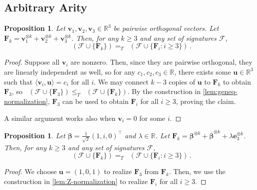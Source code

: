 \documentclass[11pt]{article}
\newtheorem{proposition}[theorem]{Proposition}
\DeclareMathOperator{\holts}{Holant^*_3}
\newcommand{\transpose}{^\intercal}
\begin{document}
\subsection{Arbitrary Arity}\label{subsec:arbitrary-arity}
\begin{proposition}\label{prop:geneq-get-all-arity}
  Let $\mathbf{v}_1, \mathbf{v}_2, \mathbf{v}_3 \in \mathbb{R}^3$ be pairwise orthogonal vectors.
  Let $\mathbf{F}_k = \mathbf{v}_1^{\otimes k} + \mathbf{v}_2^{\otimes k}  + \mathbf{v}_3^{\otimes k}$.
  Then, for any $k \ge 3$ and any set of signatures $\mathscr{F}$,
  \[
    \holts(\mathscr{F} \cup \{\mathbf{F}_k\}) =_T \holts(\mathscr{F} \cup \{\mathbf{F}_i : i \ge 3\}) \, .
  \]
\end{proposition}
\begin{proof}
  Suppose all $\mathbf{v}_i$ are nonzero.
  Then, since they are pairwise orthogonal, they are linearly independent as well, so 
  for any $c_1, c_2, c_3 \in \mathbb{R}$,
  there exists some $\mathbf{u} \in \mathbb{R}^3$ such that $\langle \mathbf{v}_i, \mathbf{u} \rangle = c_i$ for all $i$.
  We may connect $k - 3$ copies of $\mathbf{u}$ to $\mathbf{F}_k$ to obtain $\mathbf{F}_3$, so $\holts(\mathscr{F} \cup \{\mathbf{F}_3\}) \le_T \holts(\mathscr{F} \cup \{\mathbf{F}_k\})$.
  By the construction in \cref{lem:geneq-normalization}, $\mathbf{F}_3$ can be used to obtain $\mathbf{F}_i$ for all $i \ge 3$, proving the claim.

  A similar argument works also when $\mathbf{v}_i = 0$ for some $i$.
\end{proof}

\begin{proposition}\label{prop:z-get-all-arity}
  Let $\boldsymbol{\beta} = \frac{1}{\sqrt{2}}(1, i, 0)\transpose$ and $\lambda \in \mathbb{R}$.
  Let $\mathbf{F}_k = \boldsymbol{\beta}^{\otimes k} + \overline{\boldsymbol{\beta}}^{\otimes k} + \lambda \mathbf{e}_3^{\otimes k}$.
  Then, for any $k \ge 3$ and any set of signatures $\mathscr{F}$,
  \[
    \holts(\mathscr{F} \cup \{\mathbf{F}_k\}) =_T \holts(\mathscr{F} \cup \{\mathbf{F}_i : i \ge 3\}) \, .
  \]
\end{proposition}
\begin{proof}
  We choose $\mathbf{u} = (1, 0, 1)$ to realize $\mathbf{F}_3$ from $\mathbf{F}_k$.
  Then, we use the construction in \cref{lem:Z-normalization} to realize $\mathbf{F}_i$ for all $i \ge 3$.
\end{proof}
\end{document}
